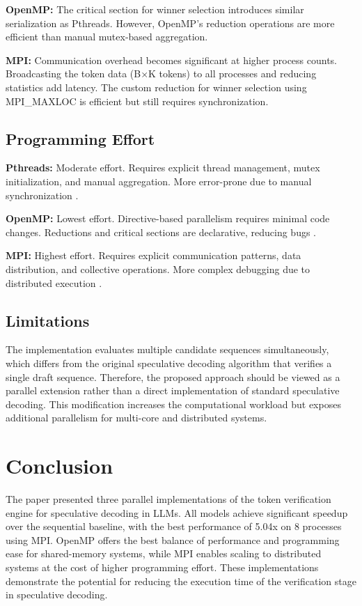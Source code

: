 \documentclass[conference]{IEEEtran}
\begin{document}
\textbf{OpenMP:} The critical section for winner selection introduces similar serialization as Pthreads. However, OpenMP's reduction operations are more efficient than manual mutex-based aggregation.

\textbf{MPI:} Communication overhead becomes significant at higher process counts. Broadcasting the token data (B×K tokens) to all processes and reducing statistics add latency. The custom reduction for winner selection using MPI\_MAXLOC is efficient but still requires synchronization.

\subsection{Programming Effort}

\textbf{Pthreads:} Moderate effort. Requires explicit thread management, mutex initialization, and manual aggregation. More error-prone due to manual synchronization \cite{pacheco2011,quinn2004}.

\textbf{OpenMP:} Lowest effort. Directive-based parallelism requires minimal code changes. Reductions and critical sections are declarative, reducing bugs \cite{chapman2007,schmidt2015}.

\textbf{MPI:} Highest effort. Requires explicit communication patterns, data distribution, and collective operations. More complex debugging due to distributed execution \cite{gropp2014,grama2003}.

\subsection{Limitations}

The implementation evaluates multiple candidate sequences simultaneously, which differs from the original speculative decoding algorithm that verifies a single draft sequence. Therefore, the proposed approach should be viewed as a parallel extension rather than a direct implementation of standard speculative decoding. This modification increases the computational workload but exposes additional parallelism for multi-core and distributed systems.

\section{Conclusion}
\label{sec:conclusion}

The paper presented three parallel implementations of the token verification engine for speculative decoding in LLMs. All models achieve significant speedup over the sequential baseline, with the best performance of 5.04x on 8 processes using MPI. OpenMP offers the best balance of performance and programming ease for shared-memory systems, while MPI enables scaling to distributed systems at the cost of higher programming effort. These implementations demonstrate the potential for reducing the execution time of the verification stage in speculative decoding.
\end{document}
